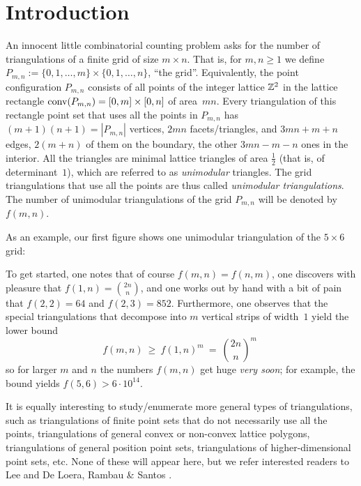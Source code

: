 
\section{Introduction}
\label{sec:intro}

An innocent little combinatorial counting problem
asks for the number of triangulations of a
finite grid of size $m\times n$.  That is, for $m,n\ge1$
we define $P_{m,n}:=\{0,1,\ldots,m\}\times\{0,1,\ldots,n\}$, ``the
grid''. Equivalently, the point configuration $P_{m,n}$ 
consists of all points of the integer lattice $\mathbb{Z}^2$
in the lattice rectangle $\mbox{\rm conv}(P_{m,n})=[0,m]\times[0,n]$
of area~$mn$.
Every triangulation of this rectangle point set that uses all the
points in $P_{m,n}$ has $(m+1)(n+1)=|P_{m,n}|$ vertices, 
$2mn$ facets/triangles,
and $3mn+m+n$ edges, $2(m+n)$ of them on the boundary, 
the other $3mn-m-n$ ones in the interior.
All the triangles are minimal lattice triangles of area $\frac12$
(that is, of determinant~$1$), which are referred to as
\emph{unimodular} triangles. The grid triangulations that
use all the points are thus called \emph{unimodular triangulations}.
The number of unimodular triangulations of the grid $P_{m,n}$
 will be denoted by $f(m,n)$.
 
 As an example, our first figure shows one unimodular triangulation of
 the $5\times 6$ grid:
\begin{center}

\end{center}
To get started, one notes that of course $f(m,n)=f(n,m)$,
one discovers with pleasure that $f(1,n)=\binom{2n}n$, and
one works out by hand with a bit of pain that $f(2,2)=64$ and $f(2,3)=852$.
Furthermore, one observes that the special triangulations that
decompose into $m$ vertical strips of width~$1$ yield the
lower bound
\begin{equation}
  \label{eq:easylow}
  f(m,n)\ \ge\ f(1,n)^m\ =\ \binom{2n}n^m\;
\end{equation}
so for larger $m$ and $n$ the numbers $f(m,n)$ get huge \emph{very soon};
for example, the bound yields $f(5,6) > 6 \cdot 10^{14}$.

It is equally interesting to study/enumerate more
general types of triangulations, such as
triangulations of finite point sets that do not necessarily use 
all the points, triangulations of general convex or non-convex
lattice polygons, triangulations of general position
point sets, triangulations of higher-dimensional point sets, etc.
None of these will appear here, but we refer interested readers to
Lee \cite{Lee} and De Loera, Rambau \& Santos \cite{DLRS}.


